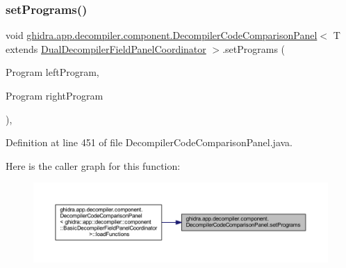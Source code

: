 \subsubsection{\texorpdfstring{setPrograms()}{setPrograms()}}
{\footnotesize\ttfamily void \mbox{\hyperlink{classghidra_1_1app_1_1decompiler_1_1component_1_1_decompiler_code_comparison_panel}{ghidra.\+app.\+decompiler.\+component.\+Decompiler\+Code\+Comparison\+Panel}}$<$ T extends \mbox{\hyperlink{classghidra_1_1app_1_1decompiler_1_1component_1_1_dual_decompiler_field_panel_coordinator}{Dual\+Decompiler\+Field\+Panel\+Coordinator}} $>$.set\+Programs (\begin{DoxyParamCaption}\item[{Program}]{left\+Program,  }\item[{Program}]{right\+Program }\end{DoxyParamCaption})\hspace{0.3cm}{\ttfamily [inline]}, {\ttfamily [protected]}}



Definition at line 451 of file Decompiler\+Code\+Comparison\+Panel.\+java.

Here is the caller graph for this function\+:
\nopagebreak
\begin{figure}[H]
\begin{center}
\leavevmode
\includegraphics[width=350pt]{classghidra_1_1app_1_1decompiler_1_1component_1_1_decompiler_code_comparison_panel_a470a68e065fb8b87a90e29d5b54f69d2_icgraph}
\end{center}
\end{figure}
\mbox{\label{classghidra_1_1app_1_1decompiler_1_1component_1_1_decompiler_code_comparison_panel_a31cc89b13763ab9ab3cb1917e096393d}} 
